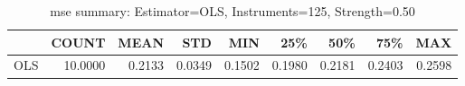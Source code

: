 \begin{table}[ht]
\centering
\caption{mse summary: Estimator=OLS, Instruments=125, Strength=0.50}
\begin{tabular}{lrrrrrrrr}
\toprule
 & COUNT & MEAN & STD & MIN & 25\% & 50\% & 75\% & MAX \\
\midrule
OLS & 10.0000 & 0.2133 & 0.0349 & 0.1502 & 0.1980 & 0.2181 & 0.2403 & 0.2598 \\
\bottomrule
\end{tabular}
\end{table}
